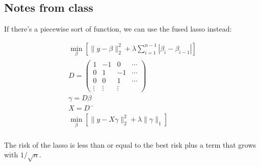\documentclass{article}
\begin{document}
\subsection{Notes from class}
If there's a piecewise sort of function, we can use the fused lasso instead:

\begin{align*}
\min_\beta \left[\lVert y-\beta\rVert_2^2+\lambda \sum_{i=1}^{n-1}|\beta_i-\beta_{i-1}|\right]\\
D=\begin{pmatrix}
1 & -1 & 0 & \cdots\\
0 & 1 & -1 & \cdots\\
0 & 0 & 1 & \cdots\\
\vdots & \vdots & \vdots
\end{pmatrix}\\
\gamma=D\beta\\
X=D^-\\
\min_\beta \left[\lVert y-X\gamma\rVert_2^2+\lambda \lVert \gamma \rVert_1 \right]\\
\end{align*}

The risk of the lasso is less than or equal to the best risk plus a term that grows with $1/\sqrt{n}$. 
\end{document}
